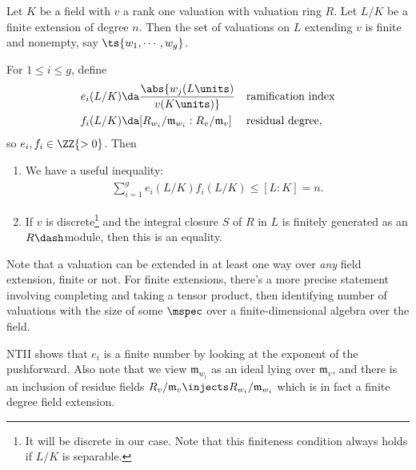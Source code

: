 \begin{theorem}

Let \(K\) be a field with \(v\) a rank one valuation with valuation ring
\(R\). Let \(L/K\) be a finite extension of degree \(n\). Then the set
of valuations on \(L\) extending \(v\) is finite and nonempty, say
\(\ts{w_1, \cdots, w_g}\).

For \(1\leq i \leq g\), define
\begin{align*}  
e_i(L/K) &\da \abs{ w_j (L\units) \over v(K\units) }  && \text{ramification index} \\
f_i(L/K) &\da [R_{w_i}/\mathfrak{m}_{w_i} : R_v/ \mathfrak{m}_v] && \text{residual degree}
,\end{align*} so \(e_i, f_i \in \ZZ{>0}\). Then

\begin{enumerate}
\def\labelenumi{\alph{enumi}.}
\item
  We have a useful inequality:
  \begin{align*}  
  \sum_{i=1}^g e_i(L/K) f_i(L/K) \leq [L: K] = n
  .\end{align*}
\item
  If \(v\) is discrete\footnote{It will be discrete in our case. Note
    that this finiteness condition always holds if \(L/K\) is separable.}
  and the integral closure \(S\) of \(R\) in \(L\) is finitely generated
  as an \(R\dash\)module, then this is an equality.
\end{enumerate}

\end{theorem}

\begin{remark}

Note that a valuation can be extended in at least one way over
\emph{any} field extension, finite or not. For finite extensions,
there's a more precise statement involving completing and taking a
tensor product, then identifying number of valuations with the size of
some \(\mspec\) over a finite-dimensional algebra over the field.

NTII shows that \(e_i\) is a finite number by looking at the exponent of
the pushforward. Also note that we view \(\mathfrak{m}_{w_i}\) as an
ideal lying over \(\mathfrak{m}_v\), and there is an inclusion of
residue fields
\(R_v/\mathfrak{m}_v \injects R_{w_i} / \mathfrak{m}_{w_i}\) which is in
fact a finite degree field extension.

\end{remark}

